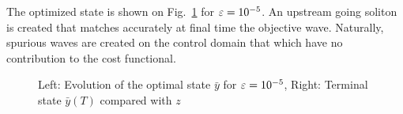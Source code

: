The optimized state is shown on Fig.~\ref{ex2fullgammadm5} for $\varepsilon = 10^{-5}$. An upstream going soliton is created that matches accurately at final time the objective wave. Naturally, spurious waves are created on the control domain that which have no contribution to the cost functional.
\begin{figure}[htb]
 \begin{subfigure}[b]{0.48\textwidth}
 \centering
 
 \end{subfigure}\qquad
 \begin{subfigure}[b]{0.48\textwidth}
 \centering
 
 \end{subfigure}
 \caption{Left: Evolution of the optimal state $\bar y$ for $\varepsilon = 10^{-5}$, Right: Terminal state $\bar y(T)$ compared with $z$}
 \label{ex2fullgammadm5}
\end{figure}




